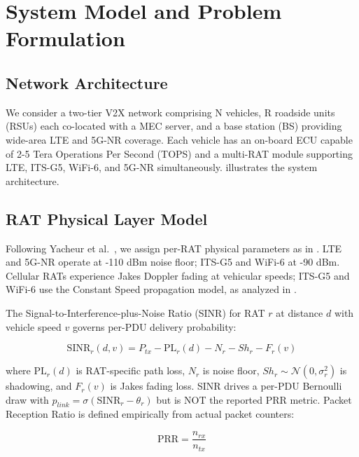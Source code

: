 \section{System Model and Problem Formulation}

\subsection{Network Architecture}

We consider a two-tier V2X network comprising N vehicles, R roadside units (RSUs) each co-located with a MEC server, and a base station (BS) providing wide-area LTE and 5G-NR coverage. Each vehicle has an on-board ECU capable of 2-5 Tera Operations Per Second (TOPS) and a multi-RAT module supporting LTE, ITS-G5, WiFi-6, and 5G-NR simultaneously.  illustrates the system architecture.



\subsection{RAT Physical Layer Model}

Following Yacheur et al.~\cite{yacheur2023}, we assign per-RAT physical parameters as in . LTE and 5G-NR operate at -110 dBm noise floor; ITS-G5 and WiFi-6 at -90 dBm. Cellular RATs experience Jakes Doppler fading at vehicular speeds; ITS-G5 and WiFi-6 use the Constant Speed propagation model, as analyzed in .



The Signal-to-Interference-plus-Noise Ratio (SINR) for RAT $r$ at distance $d$ with vehicle speed $v$ governs per-PDU delivery probability:

\begin{equation}
\label{eq:sinr}
\text{SINR}_r(d,v) = P_{tx} - \text{PL}_r(d) - N_r - Sh_r - F_r(v)
\end{equation}

where $\text{PL}_r(d)$ is RAT-specific path loss, $N_r$ is noise floor, $Sh_r \sim \mathcal{N}(0,\sigma^2_r)$ is shadowing, and $F_r(v)$ is Jakes fading loss. SINR drives a per-PDU Bernoulli draw with $p_{link} = \sigma(\text{SINR}_r - \theta_r)$ but is NOT the reported PRR metric. Packet Reception Ratio is defined empirically from actual packet counters:

\begin{equation}
\label{eq:prr}
\text{PRR} = \frac{n_{rx}}{n_{tx}}
\end{equation}

